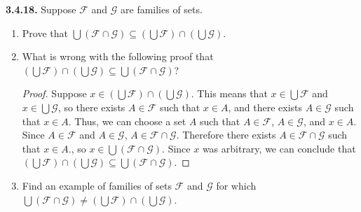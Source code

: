 \documentclass[12pt]{amsart}
\newenvironment{statement}[1]{\smallskip\noindent\color[rgb]{.6627, .3529, .6314} {\bf #1.}}{}
\theoremstyle{definition}
\theoremstyle{remark}
\begin{document}
\begin{statement}{3.4.18}
Suppose $\mathcal{F}$ and $\mathcal{G}$ are families of sets.
\begin{enumerate}
	\item Prove that $\bigcup (\mathcal{F} \cap \mathcal{G}) \subseteq
	\left( \bigcup \mathcal{F} \right) \cap \left( \bigcup \mathcal{G} \right)$.
	
	\item What is wrong with the following proof that 
	$\left( \bigcup \mathcal{F} \right) \cap \left( \bigcup \mathcal{G} \right) \subseteq
	 \bigcup (\mathcal{F} \cap \mathcal{G})$?
	 \begin{proof}
	 	Suppose $x \in \left( \bigcup \mathcal{F} \right) \cap \left( \bigcup \mathcal{G} \right)$.
	 	This means that $x \in \bigcup \mathcal{F}$ and $x \in \bigcup \mathcal{G}$,
	 	so there exists $A \in \mathcal{F}$ such that $x \in A$, 
	 	and there exists $A \in \mathcal{G}$ such that $x \in A$.
	 	Thus, we can choose a set $A$ such that 
	 	$A \in \mathcal{F}$, $A \in \mathcal{G}$, and $x \in A$.
	 	Since $A \in \mathcal{F}$ and $A \in \mathcal{G}$, $A \in \mathcal{F} \cap \mathcal{G}$.
	 	Therefore there exists $A \in \mathcal{F} \cap \mathcal{G}$ such that $x \in A$.,
	 	so $x \in \bigcup (\mathcal{F} \cap \mathcal{G})$.
	 	Since $x$ was arbitrary, we can conclude that
	 	$\left( \bigcup \mathcal{F} \right) \cap \left( \bigcup \mathcal{G} \right) \subseteq
	 	\bigcup (\mathcal{F} \cap \mathcal{G})$.
	 \end{proof}
	 
	 \item Find an example of families of sets $\mathcal{F}$ and $\mathcal{G}$ for which
	 $\bigcup (\mathcal{F} \cap \mathcal{G}) \neq
	\left( \bigcup \mathcal{F} \right) \cap \left( \bigcup \mathcal{G} \right)$.
\end{enumerate}
\end{statement}
\end{document}
